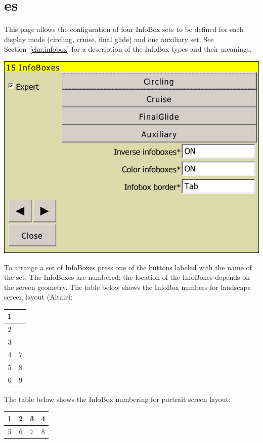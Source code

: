 
\clearpage
\section{{\InfoBox}es}

This page allows the configuration of four InfoBox sets to be defined for each
display mode (circling, cruise, final glide) and one auxiliary set.  See
Section~\ref{cha:infobox} for a description of the InfoBox types and their meanings.

\begin{center}
\includegraphics[angle=0,width=0.8\linewidth,keepaspectratio='true']{figures/config-infoboxes.png}
\end{center}

To arrange a set of InfoBoxes press one of the buttons labeled with the name
of the set.  The InfoBoxes are numbered; the location of the InfoBoxes depends
on the screen geometry.  The table below shows the InfoBox numbers for landscape screen layout (Altair):

\begin{tabular}{|c|c|}
\hline
1 &  \\
\hline
2 &  \\
\hline
3 &  \\
\hline
4 & 7 \\
\hline
5 & 8 \\
\hline
6 & 9 \\
\hline
\end{tabular}

The table below shows the InfoBox numbering for portrait screen layout:

\begin{tabular}{|c|c|c|c|}
\hline
1 & 2 & 3 & 4 \\
\hline
\hline
5 & 6 & 7 & 8 \\
\hline
\end{tabular}

